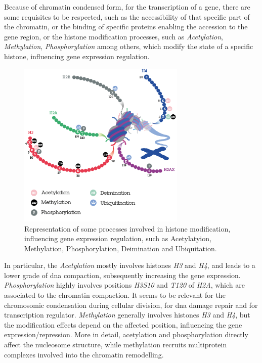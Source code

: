 Because of chromatin condensed form, for the transcription of a gene, there are some requisites to be respected, such as the accessibility of that specific part of the chromatin, or the binding of specific proteins enabling the accession to the gene region, or the histone modification processes, such as \textit{Acetylation}, \textit{Methylation}, \textit{Phosphorylation} among others, which modify the state of a specific histone, influencing gene expression regulation. 

\begin{figure}[h]
\centering
\includegraphics[width=8cm, keepaspectratio]{img/intro/hm.png}
\caption[Histon modification]{Representation of some processes involved in histone modification, influencing gene expression regulation, such as Acetylatyion, Methylation, Phosphorylation, Deimination and Ubiquitation.}
\label{fig:histmod}
\end{figure}


In particular, the \textit{Acetylation} mostly involves histones \textit{H3} and \textit{H4}, and leads to a lower grade of \gls{dna} compaction, subsequently increasing the gene expression.
\textit{Phosphorylation} highly involves positions \textit{H3S10} and \textit{T120} of \textit{H2A}, which are associated to the chromatin compaction.
It seems to be relevant for the chromosomic condensation during cellular division, for \gls{dna} damage repair and for transcription regulator.
\textit{Methylation} generally involves histones \textit{H3} and \textit{H4}, but the modification effects depend on the affected position, influencing the gene expression/repression.
More in detail, acetylation and phosphorylation directly affect the nucleosome structure, while methylation recruits multiprotein complexes involved into the chromatin remodelling.

